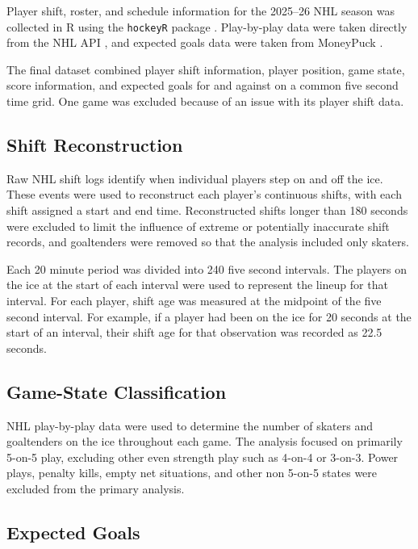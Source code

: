 \documentclass[
  12pt]{article}
\begin{document}
Player shift, roster, and schedule information for the 2025--26 NHL
season was collected in R using the \texttt{hockeyR} package
\citep{hockeyR}. Play-by-play data were taken directly from the NHL API
\citep{nhlAPI}, and expected goals data were taken from MoneyPuck
\citep{moneyPuck}.

The final dataset combined player shift information, player position,
game state, score information, and expected goals for and against on a
common five second time grid. One game was excluded because of an issue
with its player shift data.

\subsection{Shift Reconstruction}\label{shift-reconstruction}

Raw NHL shift logs identify when individual players step on and off the
ice. These events were used to reconstruct each player's continuous
shifts, with each shift assigned a start and end time. Reconstructed
shifts longer than 180 seconds were excluded to limit the influence of
extreme or potentially inaccurate shift records, and goaltenders were
removed so that the analysis included only skaters.

Each 20 minute period was divided into 240 five second intervals. The
players on the ice at the start of each interval were used to represent
the lineup for that interval. For each player, shift age was measured at
the midpoint of the five second interval. For example, if a player had
been on the ice for 20 seconds at the start of an interval, their shift
age for that observation was recorded as 22.5 seconds.

\subsection{Game-State Classification}\label{game-state-classification}

NHL play-by-play data were used to determine the number of skaters and
goaltenders on the ice throughout each game. The analysis focused on
primarily 5-on-5 play, excluding other even strength play such as 4-on-4
or 3-on-3. Power plays, penalty kills, empty net situations, and other
non 5-on-5 states were excluded from the primary analysis.

\subsection{Expected Goals}\label{expected-goals}
\end{document}
